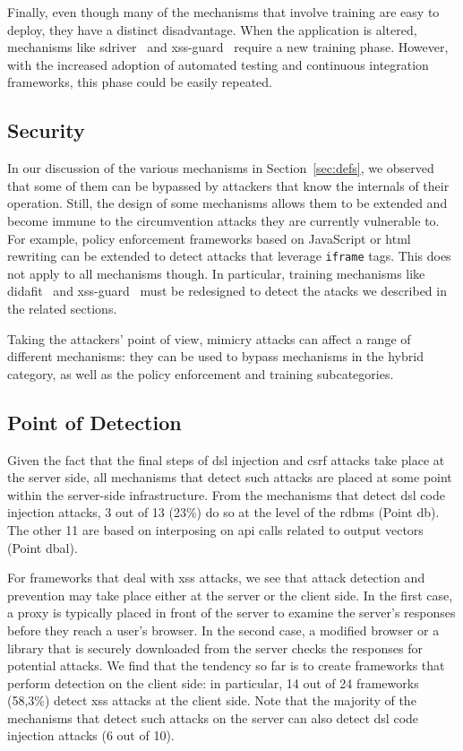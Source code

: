 \documentclass[10pt,journal,compsoc]{IEEEtran}
\begin{document}
Finally, even though many of the mechanisms that involve
training are easy to deploy, they have a distinct disadvantage.
When the application is altered, mechanisms like
{\sc sd}river~\cite{MS09}
and {\sc xss-guard}~\cite{BV08} require a new training phase.
However, with the increased adoption of automated testing
and continuous integration frameworks, this phase could be
easily repeated.

\subsection{Security}

In our discussion of the various mechanisms in Section~\ref{sec:defs}, we
observed that some of them can be bypassed by attackers that know
the internals of their operation.
Still, the design of some mechanisms allows them to
be extended and become immune to the circumvention attacks they are
currently vulnerable to. For example, policy enforcement frameworks
based on JavaScript or {\sc html} rewriting can be extended
to detect attacks that leverage {\tt iframe} tags. This does not apply
to all mechanisms though. In particular, training mechanisms like {\sc
  didafit}~\cite{LLW02} and {\sc xss-guard}~\cite{BV08} must be
redesigned to detect the atacks we described in the related sections.

Taking the attackers' point of view, mimicry attacks can affect a
range of different mechanisms: they can be used to bypass mechanisms
in the hybrid category, as well as the policy enforcement and training
subcategories.

\subsection{Point of Detection}

Given the fact that the final steps of
{\sc dsl} injection and {\sc csrf} attacks take place
at the server side, all mechanisms that detect
such attacks are placed at some point within the server-side infrastructure.
From the mechanisms that detect {\sc dsl} code injection
attacks, 3 out of 13 (23\%) do so at the level
of the {\sc rdbms} (Point {\sc db}).
The other 11 are based on interposing on {\sc api} calls related to output
vectors (Point {\sc dbal}).

For frameworks that deal with {\sc xss} attacks, we
see that attack detection and prevention may take place either at the server or
the client side. In the first case, a proxy is typically placed in front of the server
to examine the server's responses before they reach a user's 
browser. In the second case, a modified browser or a library that is
securely downloaded from the server checks the responses for potential
attacks. We find that the tendency so far is to create frameworks that
perform detection on the client side: in particular, 14 out of 24
frameworks (58,3\%) detect {\sc xss} attacks at the
client side. Note that the majority of the mechanisms that detect
such attacks on the server can also detect {\sc dsl} code
injection attacks (6 out of 10).
\end{document}
